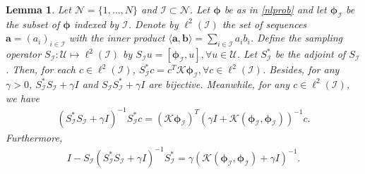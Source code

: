 \documentclass[10pt,reqno]{amsart}
\newcommand{\1}{{\chi}}
\numberwithin{equation}{section}
\theoremstyle{thmlemcorr}
\numberwithin{theorem}{section}
\newtheorem{lemma}[theorem]{Lemma}
\theoremstyle{thmlemcorr*}
\theoremstyle{defi}
\theoremstyle{remexample}
\theoremstyle{ass}
\begin{document}
\begin{lemma}
	\label{solm}
	Let $\mathcal{N}=\{1, \dots, N\}$ and $\mathcal{I}\subset \mathcal{N}$. Let $\boldsymbol{\phi}$ be as in \eqref{nlprob} and let $\boldsymbol{\phi}_{\mathcal{I}}$ be the subset of $\boldsymbol{\phi}$ indexed by $\mathcal{I}$. Denote by $\ell^2(\mathcal{I})$ the set of sequences $\boldsymbol{a}=(a_{i})_{i \in \mathcal{I}}$ with the inner product $\langle \boldsymbol{a}, \boldsymbol{b}\rangle=\sum_{i\in \mathcal{I}}a_{i}b_{i}$. 
	Define the sampling operator $S_{\mathcal{I}}:\mathcal{U}\mapsto \ell^2(\mathcal{I})$ by $
		S_{\mathcal{I}}u=[\boldsymbol{\phi}_{\mathcal{I}}, u], \forall u\in \mathcal{U}$.
	Let $S_{\mathcal{I}}^*$ be the adjoint of $S_{\mathcal{I}}$.  Then, for each $c\in \ell^2(\mathcal{I})$, 
		$S_{\mathcal{I}}^*c = c^T\mathcal{K}\boldsymbol{\phi}_{\mathcal{I}}, \forall c\in \ell^2(\mathcal{I})$. 
	Besides, for any $\gamma>0$, ${S}_{\mathcal{I}}^*{S}_{\mathcal{I}}+\gamma I$ and ${S}_{\mathcal{I}}{S}_{\mathcal{I}}^*+\gamma I$ are bijective. Meanwhile, 
	for any $c\in \ell^2(\mathcal{I})$, we have
	\begin{align}
		\label{eqre0}
		({S}_{\mathcal{I}}^*{S}_{\mathcal{I}}+\gamma I)^{-1}{S}_{\mathcal{I}}^*c = (\mathcal{K}\boldsymbol{\phi}_{\mathcal{I}})^T(\gamma I + \mathcal{K}(\boldsymbol{\phi}_{\mathcal{I}}, \boldsymbol{\phi}_{\mathcal{I}}))^{-1}c. 
	\end{align}
	Furthermore, 
	\begin{align}
		\label{bdImus}
		I-S_{\mathcal{I}}(S_{\mathcal{I}}^*S_{\mathcal{I}}+\gamma I)^{-1}S_{\mathcal{I}}^*=\gamma(\mathcal{K}(\boldsymbol{\phi}_{\mathcal{I}}, \boldsymbol{\phi}_{\mathcal{I}})+\gamma I)^{-1}. 
	\end{align}
\end{lemma}
\end{document}
